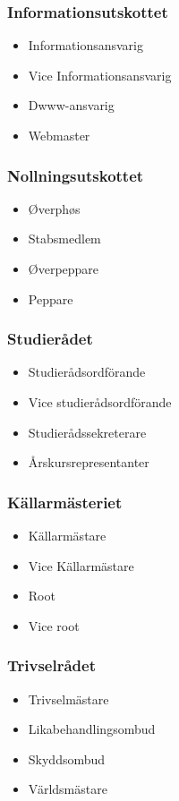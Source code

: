 \documentclass{dsekprotokoll}
\begin{document}
\begin{multicols}{2}
  \subsubsection*{Informationsutskottet}
  \begin{itemize}
    \item Informationsansvarig
    \item Vice Informationsansvarig
    \item Dwww-ansvarig
    \item Webmaster
  \end{itemize}
  \subsubsection*{Nollningsutskottet}
  \begin{itemize}
    \item Øverphøs
    \item Stabsmedlem
    \item \O verpeppare
    \item Peppare
  \end{itemize}
  \subsubsection*{Studierådet}
  \begin{itemize}
    \item Studierådsordförande
    \item Vice studierådsordförande
    \item Studierådssekreterare
    \item Årskursrepresentanter
  \end{itemize}
  \subsubsection*{Källarmästeriet}
  \begin{itemize}
    \item Källarmästare
    \item Vice Källarmästare
    \item Root
    \item Vice root
  \end{itemize}
  \subsubsection*{Trivselrådet}
  \begin{itemize}
    \item Trivselmästare
    \item Likabehandlingsombud
    \item Skyddsombud
    \item Världsmästare
  \end{itemize}

\end{multicols}
\end{document}
